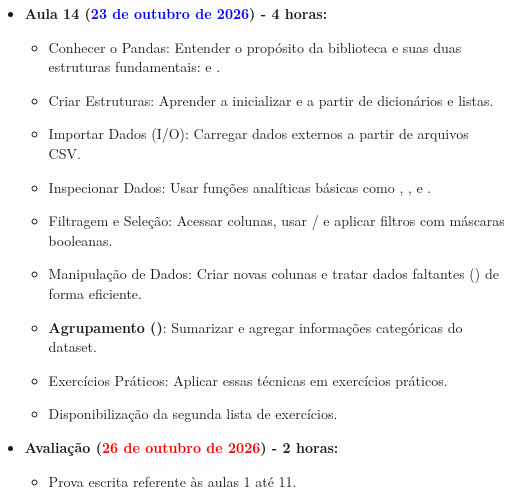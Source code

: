 \begin{itemize}
    \item \textbf{Aula 14 (\textcolor{blue}{23 de outubro de 2026}) - 4 horas:}
    \begin{itemize}\justifying
        \item Conhecer o Pandas: Entender o propósito da biblioteca e suas duas estruturas fundamentais:  e .
        \item Criar Estruturas: Aprender a inicializar  e  a partir de dicionários e listas.
        \item Importar Dados (I/O): Carregar dados externos a partir de arquivos CSV.
        \item Inspecionar Dados: Usar funções analíticas básicas como , ,  e .
        \item Filtragem e Seleção: Acessar colunas, usar  /  e aplicar filtros com máscaras booleanas.
        \item Manipulação de Dados: Criar novas colunas e tratar dados faltantes () de forma eficiente.
        \item \textbf{Agrupamento ()}: Sumarizar e agregar informações categóricas do dataset.
        \item Exercícios Práticos: Aplicar essas técnicas em exercícios práticos.
        \item Disponibilização da segunda lista de exercícios.
    \end{itemize}


    \item \textbf{Avaliação (\textcolor{red}{26 de outubro de 2026}) - 2 horas:}
    \begin{itemize}\justifying
        \item Prova escrita referente às aulas 1 até 11.
    \end{itemize}


\end{itemize}
